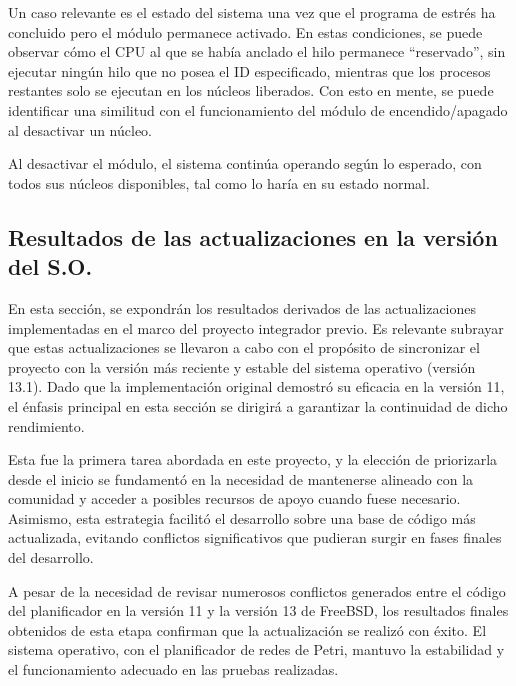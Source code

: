 
Un caso relevante es el estado del sistema una vez que el programa de estrés ha concluido pero el módulo permanece activado. En estas condiciones, se puede observar cómo el CPU al que se había anclado el hilo permanece “reservado”, sin ejecutar ningún hilo que no posea el ID especificado, mientras que los procesos restantes solo se ejecutan en los núcleos liberados. Con esto en mente, se puede identificar una similitud con el funcionamiento del módulo de encendido/apagado al desactivar un núcleo.\par

Al desactivar el módulo, el sistema continúa operando según lo esperado, con todos sus núcleos disponibles, tal como lo haría en su estado normal.


\subsection{Resultados de las actualizaciones en la versión del S.O.}
En esta sección, se expondrán los resultados derivados de las actualizaciones implementadas en el marco del proyecto integrador previo. Es relevante subrayar que estas actualizaciones se llevaron a cabo con el propósito de sincronizar el proyecto con la versión más reciente y estable del sistema operativo (versión 13.1). Dado que la implementación original demostró su eficacia en la versión 11, el énfasis principal en esta sección se dirigirá a garantizar la continuidad de dicho rendimiento.\par

Esta fue la primera tarea abordada en este proyecto, y la elección de priorizarla desde el inicio se fundamentó en la necesidad de mantenerse alineado con la comunidad y acceder a posibles recursos de apoyo cuando fuese necesario. Asimismo, esta estrategia facilitó el desarrollo sobre una base de código más actualizada, evitando conflictos significativos que pudieran surgir en fases finales del desarrollo.\par

A pesar de la necesidad de revisar numerosos conflictos generados entre el código del planificador en la versión 11 y la versión 13 de FreeBSD, los resultados finales obtenidos de esta etapa confirman que la actualización se realizó con éxito. El sistema operativo, con el planificador de redes de Petri, mantuvo la estabilidad y el funcionamiento adecuado en las pruebas realizadas.\par

